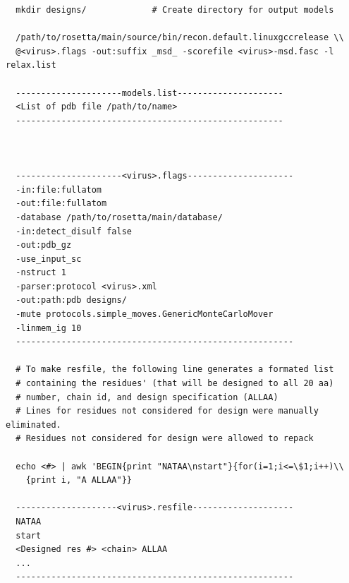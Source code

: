 \documentclass[10pt]{article}
\begin{document}
\begin{lstlisting}
  mkdir designs/             # Create directory for output models

  /path/to/rosetta/main/source/bin/recon.default.linuxgccrelease \\
  @<virus>.flags -out:suffix _msd_ -scorefile <virus>-msd.fasc -l relax.list 

  ---------------------models.list---------------------
  <List of pdb file /path/to/name>
  -----------------------------------------------------


  
  ---------------------<virus>.flags---------------------
  -in:file:fullatom
  -out:file:fullatom
  -database /path/to/rosetta/main/database/
  -in:detect_disulf false
  -out:pdb_gz
  -use_input_sc
  -nstruct 1
  -parser:protocol <virus>.xml
  -out:path:pdb designs/
  -mute protocols.simple_moves.GenericMonteCarloMover
  -linmem_ig 10
  -------------------------------------------------------

  # To make resfile, the following line generates a formated list
  # containing the residues' (that will be designed to all 20 aa)
  # number, chain id, and design specification (ALLAA)
  # Lines for residues not considered for design were manually eliminated.
  # Residues not considered for design were allowed to repack
  
  echo <#> | awk 'BEGIN{print "NATAA\nstart"}{for(i=1;i<=\$1;i++)\\
    {print i, "A ALLAA"}}
  
  --------------------<virus>.resfile--------------------
  NATAA
  start
  <Designed res #> <chain> ALLAA
  ...
  -------------------------------------------------------



\end{lstlisting}
\end{document}

